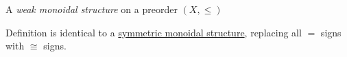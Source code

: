 A \emph{weak monoidal structure} on a preorder $(X, \leq)$

Definition is identical to a \href{doc/1 math/Seven Sketches in Compositionality/Chapter 2: Resource theories/2 Symmetric monoidal preorders/1 Definition and first examples/1 Symmetric monoidal structure on a preorder}{symmetric monoidal structure}, replacing all $=$ signs with $\cong$ signs.
